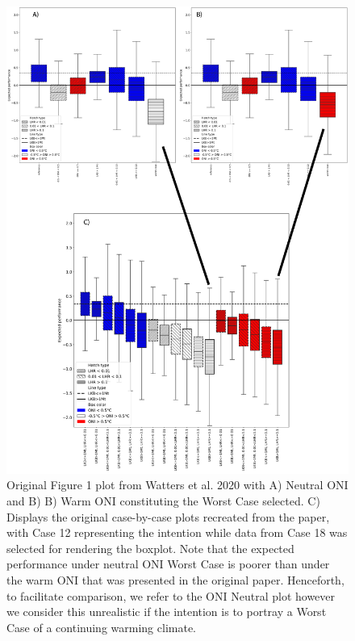 \documentclass[]{elsarticle} %
\begin{document}
\begin{figure}
\includegraphics[width=0.75\linewidth]{./Watters EMM figures/Watters original and mistake} \caption{Original Figure 1 plot from Watters et al. 2020 with A) Neutral ONI and B) B) Warm ONI constituting the Worst Case selected.  C) Displays the original case-by-case plots recreated from the paper, with Case 12 representing the intention while data from Case 18 was selected for rendering the boxplot.  Note that the expected performance under neutral ONI Worst Case is poorer than under the warm ONI that was presented in the original paper.  Henceforth, to facilitate comparison, we refer to the ONI Neutral plot however we consider this unrealistic if the intention is to portray a Worst Case of a continuing warming climate.}\label{fig:Watters original and mistake}
\end{figure}
\end{document}
